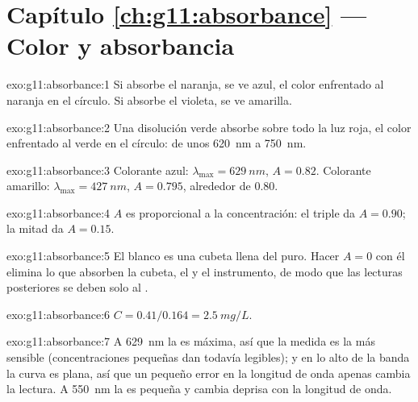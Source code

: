 \section*{Capítulo \ref{ch:g11:absorbance} --- Color y absorbancia}

\begin{solution}{exo:g11:absorbance:1}
Si absorbe el naranja, se ve azul, el color enfrentado al naranja en el
círculo. Si absorbe el violeta, se ve amarilla.
\end{solution}

\begin{solution}{exo:g11:absorbance:2}
Una disolución verde absorbe sobre todo la luz roja, el color enfrentado
al verde en el círculo: de unos \qty{620}{nm} a \qty{750}{nm}.
\end{solution}

\begin{solution}{exo:g11:absorbance:3}
Colorante azul: $\lambda_{\max} = \qty{629}{nm}$, $A = 0.82$. Colorante
amarillo: $\lambda_{\max} = \qty{427}{nm}$, $A = 0.795$, alrededor de
0.80.
\end{solution}

\begin{solution}{exo:g11:absorbance:4}
$A$ es proporcional a la concentración: el triple da $A = 0.90$; la
mitad da $A = 0.15$.
\end{solution}

\begin{solution}{exo:g11:absorbance:5}
El blanco es una cubeta llena del  puro. Hacer $A = 0$ con él
elimina lo que absorben la cubeta, el  y el instrumento, de
modo que las lecturas posteriores se deben solo al .
\end{solution}

\begin{solution}{exo:g11:absorbance:6}
$C = 0.41 / 0.164 = \qty{2.5}{mg/L}$.
\end{solution}

\begin{solution}{exo:g11:absorbance:7}
A \qty{629}{nm} la  es máxima, así que la medida es la más
sensible (concentraciones pequeñas dan todavía  legibles); y
en lo alto de la banda la curva es plana, así que un pequeño error en la
longitud de onda apenas cambia la lectura. A \qty{550}{nm} la 
es pequeña y cambia deprisa con la longitud de onda.
\end{solution}

